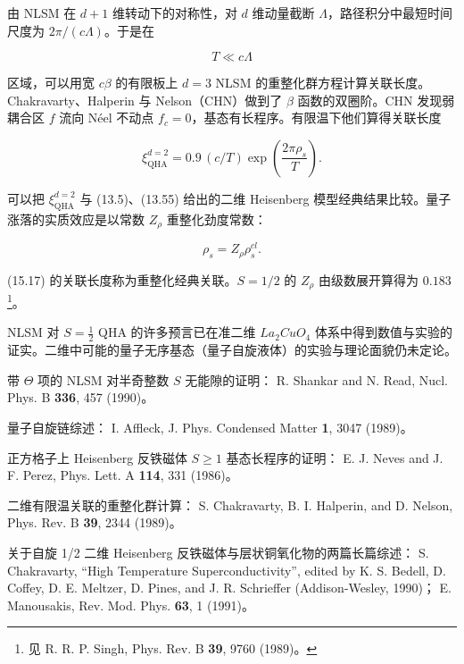 由 NLSM 在 $d+1$ 维转动下的对称性，对 $d$ 维动量截断 $\Lambda$，路径积分中最短时间尺度为 $2\pi/(c\Lambda)$。于是在

\begin{equation*}
T \ll c \Lambda
\tag{15.16}
\end{equation*}

区域，可以用宽 $c\beta$ 的有限板上 $d=3$ NLSM 的重整化群方程计算关联长度。Chakravarty、Halperin 与 Nelson（CHN）做到了 $\beta$ 函数的双圈阶。CHN 发现弱耦合区 $f$ 流向 Néel 不动点 $f_{c}=0$，基态有长程序。有限温下他们算得关联长度

\begin{equation*}
\xi_{\mathrm{QHA}} ^ {d = 2} = 0. 9 \, ( c / T ) \exp \left( \frac {2 \pi \rho_ {s}}{T} \right).
\tag{15.17}
\end{equation*}

可以把 $\xi_{\mathrm{QHA}}^{d=2}$ 与 (13.5)、(13.55) 给出的二维 Heisenberg 模型经典结果比较。量子涨落的实质效应是以常数 $Z_{\rho}$ 重整化劲度常数：

\begin{equation*}
\rho_ {s} = Z _ {\rho} \rho_ {s} ^ {cl}.
\tag{15.18}
\end{equation*}

(15.17) 的关联长度称为重整化经典关联。$S = 1/2$ 的 $Z_{\rho}$ 由级数展开算得为 $0.183$\footnote{见 R. R. P. Singh, Phys. Rev. B \textbf{39}, 9760 (1989)。}。

NLSM 对 $S = \frac{1}{2}$ QHA 的许多预言已在准二维 $La_{2}CuO_{4}$ 体系中得到数值与实验的证实。二维中可能的量子无序基态（量子自旋液体）的实验与理论面貌仍未定论。

\begin{chapbib}
\item 带 $\Theta$ 项的 NLSM 对半奇整数 $S$ 无能隙的证明：
  R. Shankar and N. Read, Nucl. Phys. B \textbf{336}, 457 (1990)。
\item 量子自旋链综述：
  I. Affleck, J. Phys. Condensed Matter \textbf{1}, 3047 (1989)。
\item 正方格子上 Heisenberg 反铁磁体 $S \geq 1$ 基态长程序的证明：
  E. J. Neves and J. F. Perez, Phys. Lett. A \textbf{114}, 331 (1986)。
\item 二维有限温关联的重整化群计算：
  S. Chakravarty, B. I. Halperin, and D. Nelson, Phys. Rev. B \textbf{39}, 2344 (1989)。
\item 关于自旋 1/2 二维 Heisenberg 反铁磁体与层状铜氧化物的两篇长篇综述：
  S. Chakravarty, ``High Temperature Superconductivity'', edited by K. S. Bedell, D. Coffey, D. E. Meltzer, D. Pines, and J. R. Schrieffer (Addison-Wesley, 1990)；
  E. Manousakis, Rev. Mod. Phys. \textbf{63}, 1 (1991)。
\end{chapbib}
